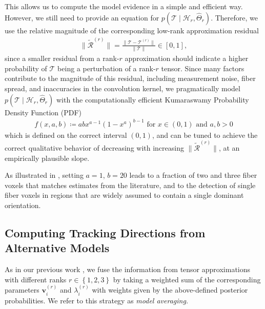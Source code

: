 This allows us to compute the model evidence in a simple and efficient way.
However, we still need to provide an equation for $p
\left( \mathcal{T} \mid \mathcal{H}_r , \hat{\Theta}_r \right)$. Therefore, we
use the relative magnitude of the corresponding low-rank approximation residual 
\begin{align}
	\| \tilde{\mathcal{R}}^{\left( r \right)} \| = \frac{ \| \mathcal{T} -
	\mathcal{T}^{\left( r \right)} \| }{ \| \mathcal{T} \|} \in \left[ 0,1
	\right],
	\label{eq:residual}
\end{align}
since a smaller residual from a rank-$r$ approximation should indicate a higher probability of $\mathcal{T}$ being a perturbation of a rank-$r$ tensor. Since many factors contribute to the magnitude of this residual, including measurement noise, fiber spread, and inaccuracies in the convolution kernel, we pragmatically model
$p
\left( \mathcal{T} \mid \mathcal{H}_r , \hat{\Theta}_r \right)$ with the computationally efficient Kumaraswamy Probability Density Function (PDF) \cite{Kumaraswamy1980}
\begin{align}
	f \left( x, a, b \right) \coloneqq ab x^{a-1} \left( 1- x^a
	\right)^{b-1} \text{ for } x \in \left( 0,1 \right) \text{ and } a,b >
	0
	\label{eq:Kumaraswamy}
\end{align}
which is defined on the correct interval $(0,1)$, and can be tuned to achieve the correct qualitative behavior of decreasing with increasing $\| \tilde{\mathcal{R}}^{\left( r \right)} \|$, at an empirically plausible slope.

As illustrated in \cite{Gruen:2021}, setting $a=1$, $b=20$ leads to a fraction of two and three fiber voxels that matches estimates from the literature, and to the detection of single fiber voxels in regions that are widely assumed to contain a single dominant orientation.

\subsection{Computing Tracking Directions from Alternative Models}
\label{sec:computing-tracking-directions}

As in our previous work \cite{Gruen:2021}, we fuse the information from tensor
approximations with different ranks $r \in \left\{ 1,2 , 3 \right\}$ by taking a weighted sum of the
corresponding parameters $\mathbf{v}_i^{\left( r \right)}$ and
$\lambda_i^{\left( r \right)}$ with weights given by the above-defined posterior probabilities. We refer to this strategy as \emph{model averaging.}


